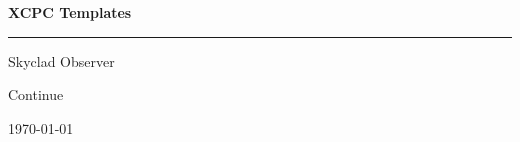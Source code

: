 \documentclass[10pt,a4paper,twoside]{article}
\begin{document}
\thispagestyle{empty} %
\begin{center}
{\Huge\bfseries XCPC Templates\par}
\vspace{1.6em}
{\rule{0.45\textwidth}{0.8pt}\par}
\vspace{1.6em}
{\LARGE Skyclad Observer\par} %
\vspace{1.2em}
{\Large Continue\par}
\vspace{0.9em}
{\large \today\par}
\end{center}
\newpage
\thispagestyle{empty} %
\hbox{} %
\newpage %
\setcounter{page}{1} %
\tableofcontents
\newpage

\end{document}
